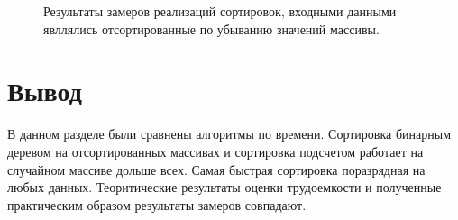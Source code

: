 \begin{figure}[ht!]
	\begin{center}
	\end{center}
	\caption{Результаты замеров реализаций сортировок, входными данными явллялись отсортированные по убыванию значений массивы.}
\end{figure}

\newpage

\section*{Вывод}

В данном разделе были сравнены алгоритмы по времени.
Сортировка бинарным деревом на отсортированных массивах и сортировка подсчетом работает на случайном массиве дольше всех.
Самая быстрая сортировка поразрядная на любых данных.
Теоритические результаты оценки трудоемкости и полученные практическим образом результаты замеров совпадают. 
